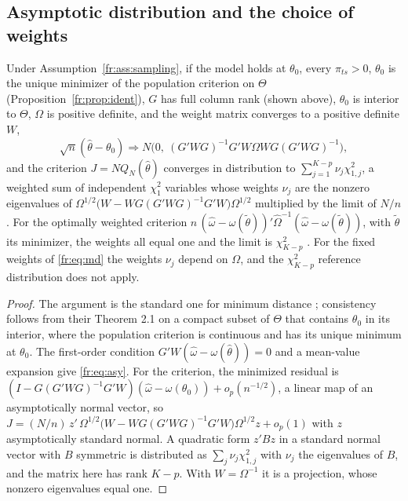 \subsection{Asymptotic distribution and the choice of weights}

\begin{proposition}
\label{fr:prop:asy}
Under Assumption~\ref{fr:ass:sampling}, if the model holds at $\theta_0$, every $\pi_{ts} > 0$, $\theta_0$ is the unique minimizer of the population criterion on $\Theta$ (Proposition~\ref{fr:prop:ident}), $G$ has full column rank (shown above), $\theta_0$ is interior to $\Theta$, $\Omega$ is positive definite, and the weight matrix converges to a positive definite $W$,
\begin{equation}
\sqrt{n}(\hat\theta - \theta_0) \Rightarrow N\!\big(0,\ (G'WG)^{-1}G'W\Omega WG(G'WG)^{-1}\big),
\label{fr:eq:asy}
\end{equation}
and the criterion $J = N Q_N(\hat\theta)$ converges in distribution to
$\sum_{j=1}^{K-p}\nu_j\chi^2_{1,j}$, a weighted sum of independent
$\chi^2_1$ variables whose weights $\nu_j$ are the nonzero
eigenvalues of $\Omega^{1/2}\big(W - WG(G'WG)^{-1}G'W\big)\Omega^{1/2}$
multiplied by the limit of $N/n$. For the optimally weighted criterion
$n\,(\hat\omega - \omega(\tilde\theta))'\hat\Omega^{-1}(\hat\omega - \omega(\tilde\theta))$, with $\tilde\theta$ its minimizer,
the weights all equal one and the limit is $\chi^2_{K-p}$
\citep{Hansen1982}. For the fixed weights of \eqref{fr:eq:md} the weights
$\nu_j$ depend on $\Omega$, and the $\chi^2_{K-p}$ reference
distribution does not apply.
\end{proposition}

\begin{proof}
The argument is the standard one for minimum distance \citep{NeweyMcFadden1994}; consistency follows from their Theorem 2.1 on a compact subset of $\Theta$ that contains $\theta_0$ in its interior, where the population criterion is continuous and has its unique minimum at $\theta_0$. The first-order condition
$G'W(\hat\omega - \omega(\hat\theta)) = 0$ and a mean-value expansion
give \eqref{fr:eq:asy}. For the criterion, the minimized residual is
$(I - G(G'WG)^{-1}G'W)(\hat\omega - \omega(\theta_0)) + o_p(n^{-1/2})$,
a linear map of an asymptotically normal vector, so
$J = (N/n)\,z'\,\Omega^{1/2}\big(W - WG(G'WG)^{-1}G'W\big)\Omega^{1/2}z + o_p(1)$
with $z$ asymptotically standard normal. A quadratic form $z'Bz$ in a
standard normal vector with $B$ symmetric is distributed as
$\sum_j \nu_j\chi^2_{1,j}$ with $\nu_j$ the eigenvalues of $B$,
and the matrix here has rank $K - p$. With $W = \Omega^{-1}$ it is a
projection, whose nonzero eigenvalues equal one.
\end{proof}

